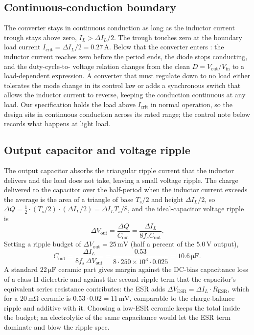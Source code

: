 

\subsection{Continuous-conduction boundary}

The converter stays in continuous conduction as long as the inductor
current trough stays above zero, $I_{L} > \Delta I_{L}/2$. The trough
touches zero at the boundary load current $I_{\text{crit}} = \Delta I_{L}/2
= 0.27\,\si{\ampere}$. Below that the converter enters
: the inductor current reaches zero
before the period ends, the diode stops conducting, and the duty-cycle-to-
voltage relation changes from the clean $D = V_{\text{out}}/V_{\text{in}}$
to a load-dependent expression. A converter that must regulate down to no
load either tolerates the mode change in its control law or adds a
synchronous switch that allows the inductor current to reverse, keeping
the conduction continuous at any load. Our specification holds the load
above $I_{\text{crit}}$ in normal operation, so the design sits in
continuous conduction across its rated range; the control note below
records what happens at light load.

\subsection{Output capacitor and voltage ripple}

The output capacitor absorbs the triangular ripple current that the
inductor delivers and the load does not take, leaving a small voltage
ripple. The charge delivered to the capacitor over the half-period when
the inductor current exceeds the average is the area of a triangle of base
$T_{s}/2$ and height $\Delta I_{L}/2$, so $\Delta Q = \tfrac{1}{2}\cdot
(T_{s}/2)\cdot(\Delta I_{L}/2) = \Delta I_{L}T_{s}/8$, and the
ideal-capacitor voltage ripple is
\[
\Delta V_{\text{out}} = \frac{\Delta Q}{C_{\text{out}}}
= \frac{\Delta I_{L}}{8 f_{s} C_{\text{out}}}.
\]
Setting a ripple budget of $\Delta V_{\text{out}} = 25\,\si{\milli\volt}$
(half a percent of the $5.0\,\si{\volt}$ output),
\[
C_{\text{out}} = \frac{\Delta I_{L}}{8 f_{s}\,\Delta V_{\text{out}}}
= \frac{0.53}{8\cdot 250\times 10^{3}\cdot 0.025}
= 10.6\,\si{\micro\farad}.
\]
A standard $22\,\si{\micro\farad}$ ceramic part gives margin against the
DC-bias capacitance loss of a class II dielectric and against the second
ripple term that the capacitor's equivalent series resistance contributes:
the ESR adds $\Delta V_{\text{ESR}} = \Delta I_{L}\cdot R_{\text{ESR}}$,
which for a $20\,\si{\milli\ohm}$ ceramic is $0.53\cdot 0.02 = 11\,\si{
\milli\volt}$, comparable to the charge-balance ripple and additive with
it. Choosing a low-ESR ceramic keeps the total inside the budget; an
electrolytic of the same capacitance would let the ESR term dominate and
blow the ripple spec.

